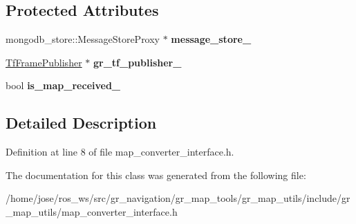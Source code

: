 \subsection*{Protected Attributes}
\begin{DoxyCompactItemize}
\item 
\mbox{\label{classgr__map__utils_1_1MapConverterInterface_a7e80da318a096f62e1a0e0866d05eafd}} 
mongodb\+\_\+store\+::\+Message\+Store\+Proxy $\ast$ {\bfseries message\+\_\+store\+\_\+}
\item 
\mbox{\label{classgr__map__utils_1_1MapConverterInterface_afeaf5a0e9b36d217da89cff6581a396b}} 
\hyperlink{classgr__map__utils_1_1TfFramePublisher}{Tf\+Frame\+Publisher} $\ast$ {\bfseries gr\+\_\+tf\+\_\+publisher\+\_\+}
\item 
\mbox{\label{classgr__map__utils_1_1MapConverterInterface_ad80118e46635f97762b0c50b5ffbf1ac}} 
bool {\bfseries is\+\_\+map\+\_\+received\+\_\+}
\end{DoxyCompactItemize}


\subsection{Detailed Description}


Definition at line 8 of file map\+\_\+converter\+\_\+interface.\+h.



The documentation for this class was generated from the following file\+:\begin{DoxyCompactItemize}
\item 
/home/jose/ros\+\_\+ws/src/gr\+\_\+navigation/gr\+\_\+map\+\_\+tools/gr\+\_\+map\+\_\+utils/include/gr\+\_\+map\+\_\+utils/map\+\_\+converter\+\_\+interface.\+h\end{DoxyCompactItemize}
